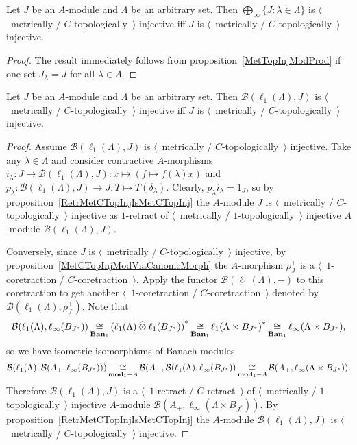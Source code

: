 \begin{corollary}\label{MetTopInjlInftySum} Let $J$ be an $A$-module and
$\Lambda$ be an arbitrary set. Then $\bigoplus_\infty \{J:\lambda\in\Lambda \}$
is $\langle$~metrically / $C$-topologically~$\rangle$ injective iff $J$ is
$\langle$~metrically / $C$-topologically~$\rangle$ injective.
\end{corollary}
\begin{proof} The result immediately follows from
proposition~\ref{MetTopInjModProd} if one set $J_\lambda=J$ 
for all $\lambda\in\Lambda$.
\end{proof}

\begin{proposition}\label{MapsFroml1toMetTopInj} Let $J$ be an $A$-module and
$\Lambda$ be an arbitrary set. Then $\mathcal{B}(\ell_1(\Lambda),J)$ is
$\langle$~metrically / $C$-topologically~$\rangle$ injective iff $J$ is
$\langle$~metrically / $C$-topologically~$\rangle$ injective.
\end{proposition}
\begin{proof} 
Assume $\mathcal{B}(\ell_1(\Lambda), J)$ is $\langle$~metrically /
$C$-topologically~$\rangle$ injective. Take any $\lambda\in\Lambda$ and consider
contractive $A$-morphisms
$i_\lambda:J\to\mathcal{B}(\ell_1(\Lambda),J):x\mapsto(f\mapsto f(\lambda)x)$
and $p_\lambda:\mathcal{B}(\ell_1(\Lambda),J)\to J:T\mapsto T(\delta_\lambda)$.
Clearly, $p_\lambda i_\lambda=1_J$, so by 
proposition~\ref{RetrMetCTopInjIsMetCTopInj} the $A$-module $J$ 
is $\langle$~metrically / $C$-topologically~$\rangle$ injective as $1$-retract 
of $\langle$~metrically / $1$-topologically~$\rangle$ injective 
$A$-module $\mathcal{B}(\ell_1(\Lambda),J)$.

Conversely, since $J$ is $\langle$~metrically / $C$-topologically~$\rangle$
injective, by proposition~\ref{MetCTopInjModViaCanonicMorph} 
the $A$-morphism $\rho_J^+$ is a
$\langle$~$1$-coretraction / $C$-coretraction~$\rangle$. Apply the functor
$\mathcal{B}(\ell_1(\Lambda),-)$ to this coretraction to get another
$\langle$~$1$-coretraction / $C$-coretraction~$\rangle$ denoted by
$\mathcal{B}(\ell_1(\Lambda),\rho_J^+)$. Note that 
$$
\mathcal{B}(\ell_1(\Lambda),\ell_\infty(B_{J^*}))
\mathop{\mathbin{\cong}}\limits_{\mathbf{Ban}_1}
{(\ell_1(\Lambda)\mathbin{\widehat{\otimes}} \ell_1(B_{J^*}))}^*
\mathop{\mathbin{\cong}}\limits_{\mathbf{Ban}_1}
{\ell_1(\Lambda\times B_{J^*})}^*
\mathop{\mathbin{\cong}}\limits_{\mathbf{Ban}_1}
\ell_\infty(\Lambda\times B_{J^*}),
$$ 
so we have isometric isomorphisms of Banach modules
$$
\mathcal{B}(\ell_1(\Lambda),\mathcal{B}(A_+,\ell_\infty(B_{J^*})))
\mathop{\mathbin{\cong}}\limits_{\mathbf{mod}_1-A}
\mathcal{B}(A_+,\mathcal{B}(\ell_1(\Lambda),\ell_\infty(B_{J^*}))
\mathop{\mathbin{\cong}}\limits_{\mathbf{mod}_1-A}
\mathcal{B}(A_+,\ell_\infty(\Lambda\times B_{J^*})).
$$ 
Therefore $\mathcal{B}(\ell_1(\Lambda),J)$ is a $\langle$~$1$-retract /
$C$-retract~$\rangle$ of $\langle$~metrically / $1$-topologically~$\rangle$
injective $A$-module $\mathcal{B}(A_+,\ell_\infty(\Lambda\times B_{J^*}))$. By
proposition~\ref{RetrMetCTopInjIsMetCTopInj} the $A$-module
$\mathcal{B}(\ell_1(\Lambda), J)$ is $\langle$~metrically /
$C$-topologically~$\rangle$ injective.
\end{proof}

